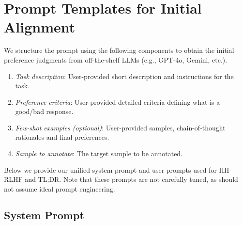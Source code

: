 \section{Prompt Templates for Initial Alignment}
\label{appendix:prompt}
We structure the prompt using the following components to obtain the initial preference judgments from off-the-shelf LLMs (e.g., GPT-4o, Gemini, etc.).  
\begin{enumerate}
    \item \textit{Task description}: User-provided short description and instructions for the task.
    \item \textit{Preference criteria}: User-provided detailed criteria defining what is a good/bad response.
    \item \textit{Few-shot examples (optional)}: User-provided samples, chain-of-thought rationales and final preferences.
    \item \textit{Sample to annotate}: The target sample to be annotated.
\end{enumerate}
Below we provide our unified system prompt and user prompts used for HH-RLHF and TL;DR. Note that these prompts are not carefully tuned, as \myname{} should not assume ideal prompt engineering.


\subsection{System Prompt}




